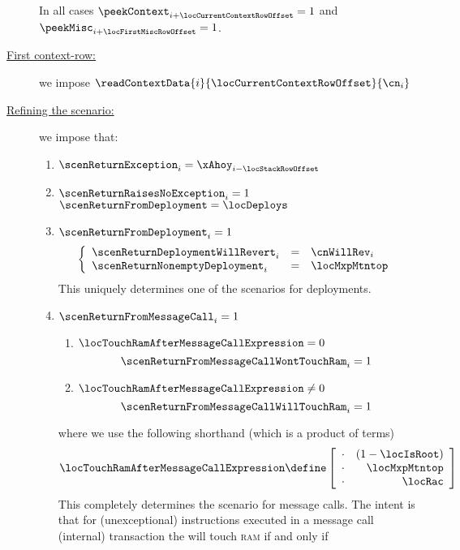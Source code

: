 \begin{description}
		\saNote{} In all cases 
		$\peekContext  _{i + \locCurrentContextRowOffset} = 1$ and
		$\peekMisc     _{i + \locFirstMiscRowOffset} = 1$.
	\item[\underline{First context-row:}]
		we impose $\readContextData{i}{\locCurrentContextRowOffset}{\cn_{i}}$
	\item[\underline{Refining the \inst{RETURN} scenario:}]
		we impose that:
		\begin{enumerate}
		        \item $\scenReturnException_{i} = \xAhoy_{i - \locStackRowOffset}$
			\item \If $\scenReturnRaisesNoException _{i} = 1$ \Then $\scenReturnFromDeployment = \locDeploys$
			\item \If $\scenReturnFromDeployment    _{i} = 1$ \Then
				\[
					\left\{ \begin{array}{lcl}
						\scenReturnDeploymentWillRevert _{i} & = & \cnWillRev _{i} \\
						\scenReturnNonemptyDeployment   _{i} & = & \locMxpMtntop   \\
					\end{array} \right.
				\]
				\saNote{}
				This uniquely determines one of the  scenarios for deployments.
			\item \If $\scenReturnFromMessageCall   _{i} = 1$ \Then
				\begin{enumerate}
					\item \If $\locTouchRamAfterMessageCallExpression =    0$ \Then \[ \scenReturnFromMessageCallWontTouchRam _{i} = 1 \]
					\item \If $\locTouchRamAfterMessageCallExpression \neq 0$ \Then \[ \scenReturnFromMessageCallWillTouchRam _{i} = 1 \]
				\end{enumerate}
				where we use the following shorthand (which is a product of terms)
				\[
					\locTouchRamAfterMessageCallExpression
					\define
					\left[ \begin{array}{cr}
                                                \cdot & (1 - \locIsRoot) \\
						\cdot & \locMxpMtntop    \\
						\cdot & \locRac          \\
					\end{array} \right]
				\]
				\saNote{} 
				This completely determines the  scenario for message calls.
				The intent is that for (unexceptional)  instructions executed in a message call (internal) transaction
				the \zkEvm{} will touch \textsc{ram} if and only if

\end{enumerate}
\end{description}
